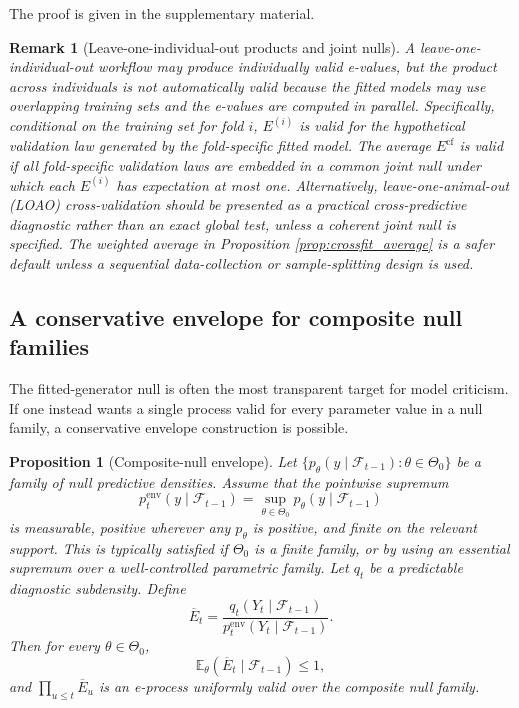 \documentclass[pdflatex,sn-basic]{sn-jnl}
\theoremstyle{thmstyleone}
\newtheorem{proposition}[theorem]{Proposition}
\theoremstyle{thmstyletwo}
\newtheorem{remark}{Remark}
\theoremstyle{thmstylethree}
\newcommand{\E}{\mathbb E}
\newcommand{\1}{\mathbf 1}
\newcommand{\calF}{\mathcal F}
\begin{document}
\noindent The proof is given in the supplementary material.
\begin{remark}[Leave-one-individual-out products and joint nulls]
A leave-one-individual-out workflow may produce individually valid e-values, but the product across individuals is not automatically valid because the fitted models may use overlapping training sets and the e-values are computed in parallel. Specifically, conditional on the training set for fold $i$, $E^{(i)}$ is valid for the hypothetical validation law generated by the fold-specific fitted model. The average $E^{\mathrm{cf}}$ is valid if all fold-specific validation laws are embedded in a common joint null under which each $E^{(i)}$ has expectation at most one. Alternatively, leave-one-animal-out (LOAO) cross-validation should be presented as a practical cross-predictive diagnostic rather than an exact global test, unless a coherent joint null is specified. The weighted average in Proposition \ref{prop:crossfit_average} is a safer default unless a sequential data-collection or sample-splitting design is used.
\end{remark}

\subsection{A conservative envelope for composite null families}
\label{sec:envelope}

The fitted-generator null is often the most transparent target for model criticism. If one instead wants a single process valid for every parameter value in a null family, a conservative envelope construction is possible.

\begin{proposition}[Composite-null envelope]
\label{prop:envelope}
Let $\{p_\theta(y\mid\calF_{t-1}):\theta\in\Theta_0\}$ be a family of null predictive densities. Assume that the pointwise supremum
\begin{equation}
 p_t^{\mathrm{env}}(y\mid\calF_{t-1})=\sup_{\theta\in\Theta_0}p_\theta(y\mid\calF_{t-1})
\end{equation}
is measurable, positive wherever any $p_\theta$ is positive, and finite on the relevant support. This is typically satisfied if $\Theta_0$ is a finite family, or by using an essential supremum over a well-controlled parametric family. Let $q_t$ be a predictable diagnostic subdensity. Define
\begin{equation}
 \overline E_t=\frac{q_t(Y_t\mid\calF_{t-1})}{p_t^{\mathrm{env}}(Y_t\mid\calF_{t-1})}.
\end{equation}
Then for every $\theta\in\Theta_0$,
\begin{equation}
 \E_\theta(\overline E_t\mid\calF_{t-1})\leq1,
\end{equation}
and $\prod_{u\leq t}\overline E_u$ is an e-process uniformly valid over the composite null family.
\end{proposition}
\end{document}
